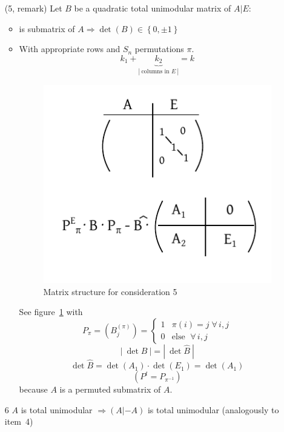 \documentclass{article}
\newcommand{\card}[1]{\left|\:\!#1\:\!\right|}
\newcommand{\set}[1]{\left\{#1\right\}}
\newcommand{\fall}{\;\forall\,}
\begin{document}
\begin{enumerate}
  \item[(5, remark)]
    Let $B$ be a quadratic total unimodular matrix of $A | E$:
    \begin{itemize}
      \item is submatrix of $A \Rightarrow \det(B) \in \set{0, \pm1}$
      \item
        With appropriate rows and $S_n$ permutations $\pi$.
        \[ k_1 + \underbrace{k_2}_{\card{\text{columns in $E$}}} = k \]
        \begin{figure}[!ht]
          \begin{center}
            \includegraphics{img/tum_second.pdf}
            \caption{Matrix structure for consideration 5}
            \label{fig:consid-5}
          \end{center}
        \end{figure}
        See figure~\ref{fig:consid-5} with \[
          P_\pi = (B_j^{(\pi)}) = \begin{cases}
            1 & \pi(i) = j \fall i,j \\
            0 & \text{else } \fall i,j
          \end{cases}
        \]
        \[ \card{\det{B}} = \card{\det{\hat{B}}} \]
        \[ \det\hat{B} = \det(A_1) \cdot \det(E_1) = \det(A_1) \]
        \[ \left(P^t = P_{\pi^{-1}}\right) \]
        because $A$ is a permuted submatrix of $A$.
    \end{itemize}

  \item[6]
    $A$ is total unimodular $\Rightarrow (A | -A)$ is total unimodular (analogously to item~4)
\end{enumerate}
\end{document}
